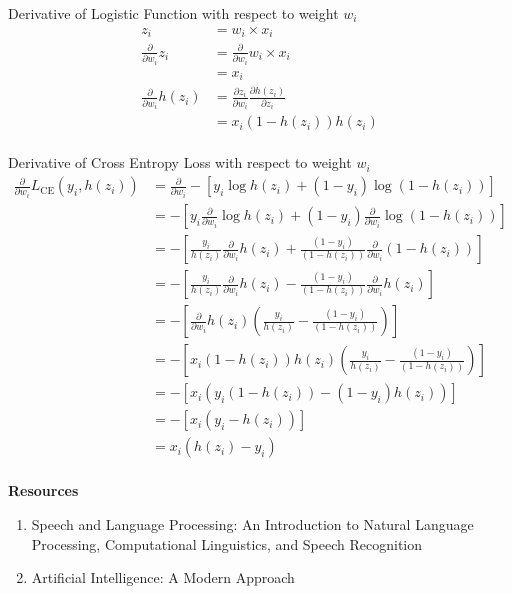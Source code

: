 Derivative of Logistic Function with respect to weight $w_i$\\
\begin{align*}
    z_i &= w_i \times x_i \\
    \frac{\partial}{\partial w_i} z_i &= \frac{\partial}{\partial w_i} w_i \times x_i\\
    &= x_i\\
    \frac{\partial}{\partial w_i} h(z_i) &= \frac{\partial z_i}{\partial w_i}\frac{\partial h(z_i)}{\partial z_i} \\
    &= x_i (1 - h(z_i)) h(z_i)\\
\end{align*}

Derivative of Cross Entropy Loss with respect to weight $w_i$\\
\begin{align*}
    \frac{\partial}{\partial w_i} L_{\text{CE}}(y_i, h(z_i)) &=
    \frac{\partial}{\partial w_i} -\left[y_i \log h(z_i) + (1-y_i) \log (1-h(z_i))\right]\\
    &= -\left[ y_i \frac{\partial}{\partial w_i} \log h(z_i) + (1-y_i) \frac{\partial}{\partial w_i} \log (1 - h(z_i)) \right]\\
    &= -\left[ \frac{y_i}{h(z_i)} \frac{\partial}{\partial w_i} h(z_i) + \frac{(1-y_i)}{(1-h(z_i))} \frac{\partial}{\partial w_i} (1 - h(z_i)) \right]\\
    &= -\left[ \frac{y_i}{h(z_i)} \frac{\partial}{\partial w_i} h(z_i) - \frac{(1-y_i)}{(1-h(z_i))} \frac{\partial}{\partial w_i} h(z_i)\right]\\
    &= -\left[ \frac{\partial}{\partial w_i} h(z_i) \left(\frac{y_i}{h(z_i)} - \frac{(1-y_i)}{(1-h(z_i))}\right)\right]\\
    &= -\left[ x_i(1-h(z_i))h(z_i) \left(\frac{y_i}{h(z_i)} - \frac{(1-y_i)}{(1-h(z_i))}\right)\right]\\
    &= -\left[ x_i \left(y_i(1-h(z_i)) - (1-y_i)h(z_i)\right)\right]\\
    &= -\left[ x_i (y_i - h(z_i))\right]\\
    &= x_i (h(z_i) - y_i) \\
\end{align*}

\textbf{Resources}
\begin{enumerate}
    \item Speech and Language Processing: An Introduction to Natural Language Processing, Computational Linguistics, and Speech Recognition~\cite{jurafsky1}
    \item Artificial Intelligence: A Modern Approach~\cite{russell1}
\end{enumerate}
